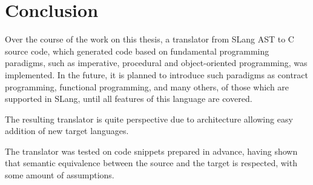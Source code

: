 \chapter{Conclusion}
\label{chap:conclusion}

Over the course of the work on this thesis, a translator from SLang AST to C source code, which generated code based on fundamental programming paradigms, such as imperative, procedural and object-oriented programming, was implemented.
In the future, it is planned to introduce such paradigms as contract programming, functional programming, and many others, of those which are supported in SLang, until all features of this language are covered.

The resulting translator is quite perspective due to architecture allowing easy addition of new target languages.

The translator was tested on code snippets prepared in advance, having shown that semantic equivalence between the source and the target is respected, with some amount of assumptions.